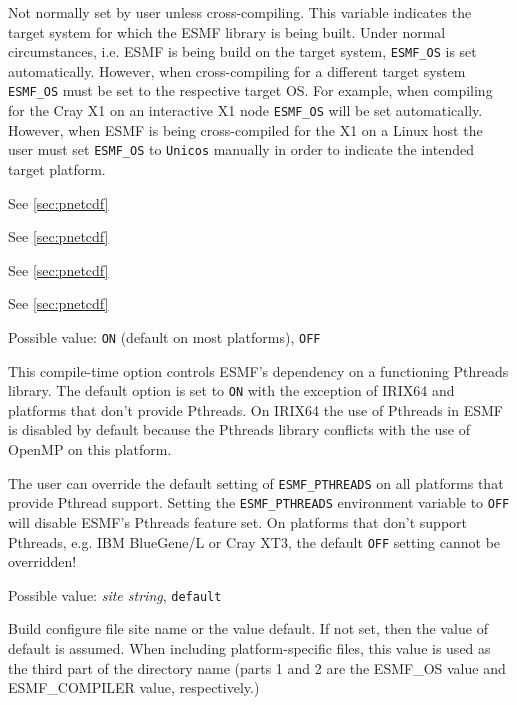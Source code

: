 \begin{description}
Not normally set by user unless cross-compiling. This variable indicates the
target system for which the ESMF library is being built. Under normal
circumstances, i.e. ESMF is being build on the target system, {\tt ESMF\_OS} is
set automatically. However, when cross-compiling for a different target system
{\tt ESMF\_OS} must be set to the respective target OS. For example, when
compiling for the Cray X1 on an interactive X1 node {\tt ESMF\_OS} will be set
automatically. However, when ESMF is being cross-compiled for the X1 on a Linux
host the user must set {\tt ESMF\_OS} to {\tt Unicos} manually in order to
indicate the intended target platform.

\item[ESMF\_PNETCDF]
See \ref{sec:pnetcdf}

\item[ESMF\_PNETCDF\_INCLUDE]
See \ref{sec:pnetcdf}

\item[ESMF\_PNETCDF\_LIBPATH]
See \ref{sec:pnetcdf}

\item[ESMF\_PNETCDF\_LIBS]
See \ref{sec:pnetcdf}

\item[ESMF\_PTHREADS]
Possible value: {\tt ON} (default on most platforms), {\tt OFF}

This compile-time option controls ESMF's dependency on a functioning
Pthreads library. The default option is set to {\tt ON} with the exception
of IRIX64 and platforms that don't provide Pthreads. On IRIX64 the use of
Pthreads in ESMF is disabled by default because the Pthreads library conflicts
with the use of OpenMP on this platform.

The user can override the default setting of {\tt ESMF\_PTHREADS} on all
platforms that provide Pthread support. Setting the {\tt ESMF\_PTHREADS}
environment variable to {\tt OFF} will disable ESMF's Pthreads feature set.
On platforms that don't support Pthreads, e.g. IBM BlueGene/L or Cray XT3, the
default {\tt OFF} setting cannot be overridden!

\item[ESMF\_SITE]
Possible value: {\em site string}, {\tt default}

Build configure file site name or the value default. If not set, then the value
of default is assumed. When including platform-specific files, this value is
used as the third part of the directory name (parts 1 and 2 are the
ESMF\_OS value and ESMF\_COMPILER value, respectively.)


\end{description}
